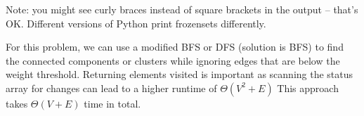 \begin{progprob}
    Note: you might see curly braces instead of square brackets in the output -- that's OK.
    Different versions of Python print frozensets differently.

    \begin{soln}
        For this problem, we can use a modified BFS or DFS (solution
        is BFS) to find the connected components or clusters while
        ignoring edges that are below the weight threshold. Returning
        elements visited is important as scanning the status array
        for changes can lead to a higher runtime of $\Theta(V^2 + E)$
        This approach takes $\Theta(V + E)$ time in total.

        \inputminted{python}{\thisdir/include-solution/cluster.py}
   \end{soln}

\end{progprob}
